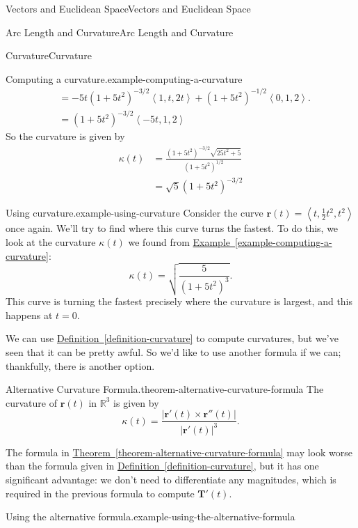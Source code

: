 \documentclass[10pt,]{book}
\numberwithin{equation}{section}
\newcommand{\RR}{\mathbb{R}}
\newcommand{\vv}[1]{\mathbf{#1}}
\newcommand{\dotprod}[1]{\left\langle #1 \right\rangle}
\begin{document}
\begin{chapterptx}{Vectors and Euclidean Space}{}{Vectors and Euclidean Space}{}{}
\begin{sectionptx}{Arc Length and Curvature}{}{Arc Length and Curvature}{}{}
\begin{subsectionptx}{Curvature}{}{Curvature}{}{}
\begin{example}{Computing a curvature.}{example-computing-a-curvature}
\begin{align*}
& = -5t(1+5t^{2})^{-3/2}\dotprod{1,t,2t} + (1 + 5t^{2})^{-1/2}\dotprod{0,1,2}. \\
& = (1+5t^{2})^{-3/2}\dotprod{-5t,1,2} 
\end{align*}
\hypertarget{p-1073}{}%
So the curvature is given by%
%
\begin{align*}
\kappa(t) & = \frac{(1+5t^{2})^{-3/2}\sqrt{25t^{2}+5}}{(1+5t^{2})^{1/2}} \\
& = \sqrt{5}(1+5t^{2})^{-3/2} 
\end{align*}
\end{example}
\begin{example}{Using curvature.}{example-using-curvature}%
\hypertarget{p-1074}{}%
Consider the curve \(\vv{r}(t) = \dotprod{t,\frac{1}{2}t^{2},t^{2}}\) once again. We'll try to find where this curve turns the fastest. To do this, we look at the curvature \(\kappa(t)\) we found from \hyperref[example-computing-a-curvature]{Example~\ref{example-computing-a-curvature}}:%
%
\begin{equation*}
\kappa(t) = \sqrt{\frac{5}{(1+5t^{2})^{3}}}.
\end{equation*}
\hypertarget{p-1075}{}%
This curve is turning the fastest precisely where the curvature is largest, and this happens at \(t=0\).%
\end{example}
\hypertarget{p-1076}{}%
We can use \hyperref[definition-curvature]{Definition~\ref{definition-curvature}} to compute curvatures, but we've seen that it can be pretty awful. So we'd like to use another formula if we can; thankfully, there is another option.%
\begin{theorem}{Alternative Curvature Formula.}{}{theorem-alternative-curvature-formula}%
\hypertarget{p-1077}{}%
The curvature of \(\vv{r}(t)\) in \(\RR^{3}\) is given by%
%
\begin{equation*}
\kappa(t) = \frac{|\vv{r}'(t)\times\vv{r}''(t)|}{|\vv{r}'(t)|^{3}}.
\end{equation*}
\end{theorem}
\hypertarget{p-1078}{}%
The formula in \hyperref[theorem-alternative-curvature-formula]{Theorem~\ref{theorem-alternative-curvature-formula}} may look worse than the formula given in \hyperref[definition-curvature]{Definition~\ref{definition-curvature}}, but it has one significant advantage: we don't need to differentiate any magnitudes, which is required in the previous formula to compute \(\vv{T}'(t)\).%
\begin{example}{Using the alternative formula.}{example-using-the-alternative-formula}%

\end{example}
\end{subsectionptx}
\end{sectionptx}
\end{chapterptx}
\end{document}
